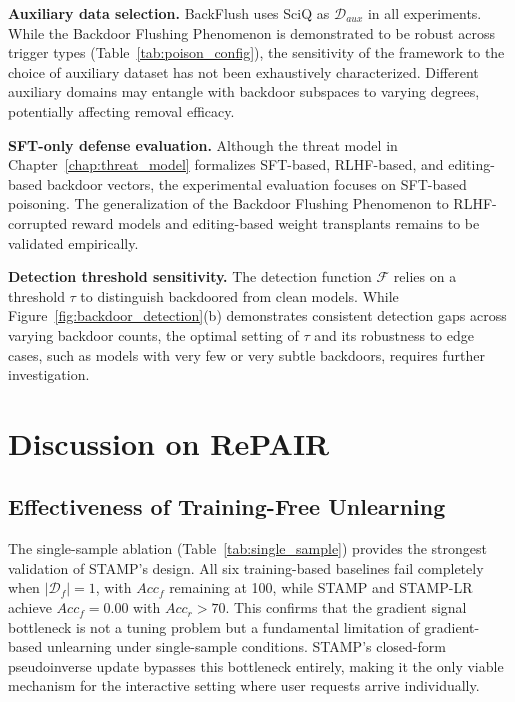 \medskip
\noindent
\textbf{Auxiliary data selection.} BackFlush uses SciQ as $\mathcal{D}_{\textit{aux}}$ in all experiments. While the Backdoor Flushing Phenomenon is demonstrated to be robust across trigger types (Table~\ref{tab:poison_config}), the sensitivity of the framework to the choice of auxiliary dataset has not been exhaustively characterized. Different auxiliary domains may entangle with backdoor subspaces to varying degrees, potentially affecting removal efficacy.

\medskip
\noindent
\textbf{SFT-only defense evaluation.} Although the threat model in Chapter~\ref{chap:threat_model} formalizes SFT-based, RLHF-based, and editing-based backdoor vectors, the experimental evaluation focuses on SFT-based poisoning. The generalization of the Backdoor Flushing Phenomenon to RLHF-corrupted reward models and editing-based weight transplants remains to be validated empirically.

\medskip
\noindent
\textbf{Detection threshold sensitivity.} The detection function $\mathcal{F}$ relies on a threshold $\tau$ to distinguish backdoored from clean models. While Figure~\ref{fig:backdoor_detection}(b) demonstrates consistent detection gaps across varying backdoor counts, the optimal setting of $\tau$ and its robustness to edge cases, such as models with very few or very subtle backdoors, requires further investigation.


\section{Discussion on RePAIR}\label{sec:disc_repair}

\subsection{Effectiveness of Training-Free Unlearning}

The single-sample ablation (Table~\ref{tab:single_sample}) provides the strongest validation of STAMP's design. All six training-based baselines fail completely when $|\mathcal{D}_f| = 1$, with $Acc_f$ remaining at 100, while STAMP and STAMP-LR achieve $Acc_f = 0.00$ with $Acc_r > 70$. This confirms that the gradient signal bottleneck is not a tuning problem but a fundamental limitation of gradient-based unlearning under single-sample conditions. STAMP's closed-form pseudoinverse update bypasses this bottleneck entirely, making it the only viable mechanism for the interactive setting where user requests arrive individually.

